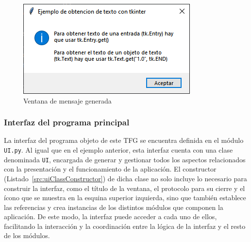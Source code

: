\begin{figure}[H]
    \centering
    \includegraphics[width=0.5\linewidth]{fig/Ejemplo Tkinter/ventana generada con mensaje.png}
    \caption{Ventana de mensaje generada}
    \label{fig:messageWindowExample}
\end{figure}

\subsubsection{Interfaz del programa principal}

La interfaz del programa objeto de este \acrshort{TFG} se encuentra definida en el módulo \texttt{UI.py}. Al igual que en el ejemplo anterior, esta interfaz cuenta con una clase denominada \texttt{UI}, encargada de generar y gestionar todos los aspectos relacionados con la presentación y el funcionamiento de la aplicación. El constructor (Listado~\ref{src:uiClassConstructor}) de dicha clase no solo incluye lo necesario para construir la interfaz, como el título de la ventana, el protocolo para su cierre y el ícono que se muestra en la esquina superior izquierda, sino que también establece las referencias y crea instancias de los distintos módulos que componen la aplicación. De este modo, la interfaz puede acceder a cada uno de ellos, facilitando la interacción y la coordinación entre la lógica de la interfaz y el resto de los módulos.

